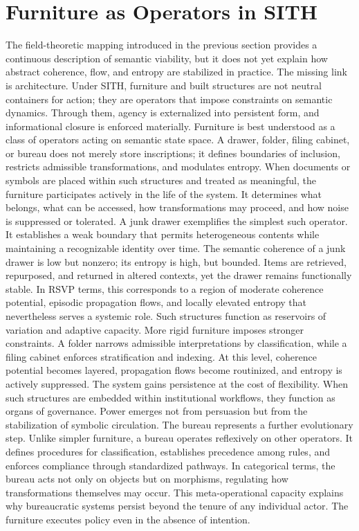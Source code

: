 \documentclass[11pt,oneside]{article}
\begin{document}
\section{Furniture as Operators in SITH}

The field-theoretic mapping introduced in the previous section provides a continuous description of semantic viability, but it does not yet explain how abstract coherence, flow, and entropy are stabilized in practice. The missing link is architecture. Under SITH, furniture and built structures are not neutral containers for action; they are operators that impose constraints on semantic dynamics. Through them, agency is externalized into persistent form, and informational closure is enforced materially.
Furniture is best understood as a class of operators acting on semantic state space. A drawer, folder, filing cabinet, or bureau does not merely store inscriptions; it defines boundaries of inclusion, restricts admissible transformations, and modulates entropy. When documents or symbols are placed within such structures and treated as meaningful, the furniture participates actively in the life of the system. It determines what belongs, what can be accessed, how transformations may proceed, and how noise is suppressed or tolerated.
A junk drawer exemplifies the simplest such operator. It establishes a weak boundary that permits heterogeneous contents while maintaining a recognizable identity over time. The semantic coherence of a junk drawer is low but nonzero; its entropy is high, but bounded. Items are retrieved, repurposed, and returned in altered contexts, yet the drawer remains functionally stable. In RSVP terms, this corresponds to a region of moderate coherence potential, episodic propagation flows, and locally elevated entropy that nevertheless serves a systemic role. Such structures function as reservoirs of variation and adaptive capacity.
More rigid furniture imposes stronger constraints. A folder narrows admissible interpretations by classification, while a filing cabinet enforces stratification and indexing. At this level, coherence potential becomes layered, propagation flows become routinized, and entropy is actively suppressed. The system gains persistence at the cost of flexibility. When such structures are embedded within institutional workflows, they function as organs of governance. Power emerges not from persuasion but from the stabilization of symbolic circulation.
The bureau represents a further evolutionary step. Unlike simpler furniture, a bureau operates reflexively on other operators. It defines procedures for classification, establishes precedence among rules, and enforces compliance through standardized pathways. In categorical terms, the bureau acts not only on objects but on morphisms, regulating how transformations themselves may occur. This meta-operational capacity explains why bureaucratic systems persist beyond the tenure of any individual actor. The furniture executes policy even in the absence of intention.
\end{document}
